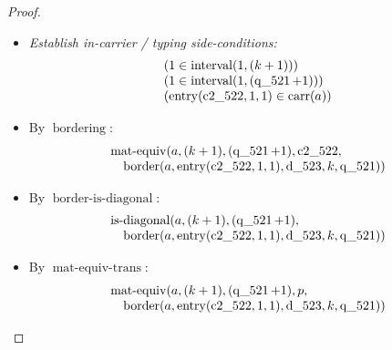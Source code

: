 \documentclass[11pt]{article}
\theoremstyle{plain}
\begin{document}
\begin{proof}
\begin{itemize}[leftmargin=2.8em, itemsep=4pt, parsep=1pt]
  \item[\textbf{84--88}] \emph{Establish in-carrier / typing side-conditions:}
\begin{equation*}
\begin{array}{@{}l@{}}
(1 \in \operatorname{interval}(1, (k + 1))) \\
(1 \in \operatorname{interval}(1, (\operatorname{q\_521} + 1))) \\
(\operatorname{entry}(\operatorname{c2\_522}, 1, 1) \in \operatorname{carr}(a))
\end{array}
\end{equation*}

  \item[\textbf{89}] By $\operatorname{bordering}$:
\begin{equation*}
\begin{array}{@{}l@{}} \operatorname{mat\text{-}equiv}(a, (k + 1), (\operatorname{q\_521} + 1), \operatorname{c2\_522}, \\ \quad \operatorname{border}(a, \operatorname{entry}(\operatorname{c2\_522}, 1, 1), \operatorname{d\_523}, k, \operatorname{q\_521})) \end{array}
\end{equation*}

  \item[\textbf{90}] By $\operatorname{border\text{-}is\text{-}diagonal}$:
\begin{equation*}
\begin{array}{@{}l@{}} \operatorname{is\text{-}diagonal}(a, (k + 1), (\operatorname{q\_521} + 1), \\ \quad \operatorname{border}(a, \operatorname{entry}(\operatorname{c2\_522}, 1, 1), \operatorname{d\_523}, k, \operatorname{q\_521})) \end{array}
\end{equation*}

  \item[\textbf{91}] By $\operatorname{mat\text{-}equiv\text{-}trans}$:
\begin{equation*}
\begin{array}{@{}l@{}} \operatorname{mat\text{-}equiv}(a, (k + 1), (\operatorname{q\_521} + 1), p, \\ \quad \operatorname{border}(a, \operatorname{entry}(\operatorname{c2\_522}, 1, 1), \operatorname{d\_523}, k, \operatorname{q\_521})) \end{array}
\end{equation*}


\end{itemize}
\end{proof}
\end{document}
